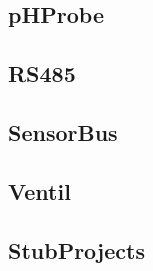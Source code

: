 \subsection{pHProbe}


\subsection{RS485}


\subsection{SensorBus}


\subsection{Ventil}


\subsection{StubProjects}
